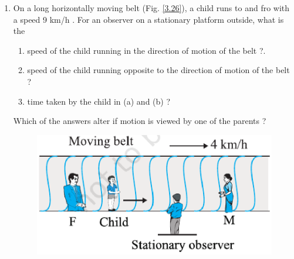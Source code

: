 \begin{enumerate}[label=\arabic*.,ref=\thesection.\theenumi]
\item  On a long horizontally moving belt (Fig. \ref{3.26}), a child runs to and fro with a speed 9 km/h
. For an observer on a
stationary platform outside, what is the 
\begin{enumerate}
\item  speed of the child running in the direction of motion of the belt ?. 
\item  speed of the child running opposite to the direction of motion of the belt ? 
\item  time taken by the child in (a) and (b) ? 
\end{enumerate}
Which of the answers alter if motion is viewed by one of the parents ?
\begin{figure}[!ht]
\centering
\includegraphics[width=\columnwidth]{./figs/11-1-3-26.eps}
\caption{}
\label{fig:3.26}
\end{figure}

\end{enumerate}
%
